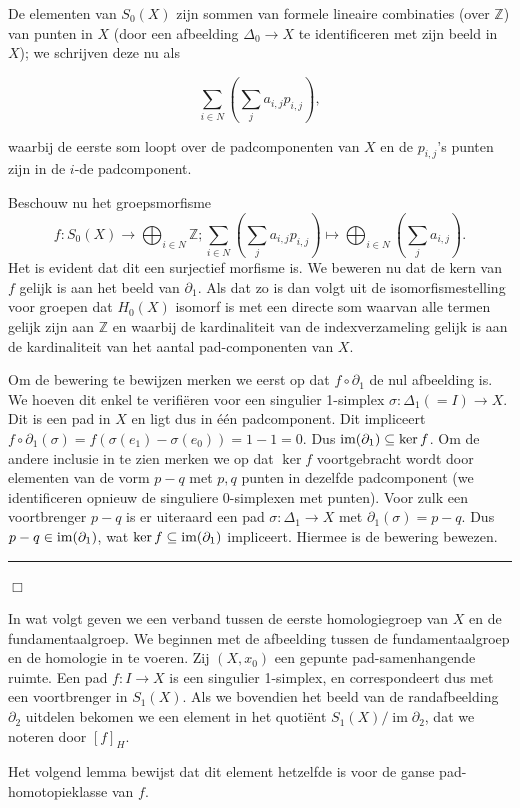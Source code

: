 \documentclass[12pt]{book}
\DeclareMathOperator{\Ima}{im}
\newcommand{\B}{\rule{1mm}{0mm} \hfill $\Box$ }
\begin{document}
De elementen van $S_{0}(X)$ zijn
sommen van formele lineaire combinaties (over $\mathbb{Z}$) van punten in $X$ (door een afbeelding
$\Delta_{0}\to X$ te identificeren met zijn beeld in $X$); we schrijven deze nu als 

$$\sum_{i\in
N}(\sum_{j}a_{i,j}p_{i,j}),$$ 


waarbij de eerste som loopt over de padcomponenten van $X$ en de
$p_{i,j}$'s punten zijn in de $i$-de padcomponent.

Beschouw nu het groepsmorfisme 
$$f:S_{0}(X)\to \bigoplus_{i\in N}\mathbb{Z};
\sum_{i\in N}(\sum_{j}a_{i,j}p_{i,j})\mapsto \bigoplus_{i\in N} (\sum_{j}a_{i,j}).$$ Het is evident dat dit een
surjectief morfisme is.  We beweren nu dat de kern van $f$ gelijk is aan het beeld van
$\partial_{1}$. Als dat zo is dan volgt uit de isomorfismestelling voor groepen dat $H_{0}(X)$
isomorf is met een directe som waarvan alle termen gelijk zijn aan $\mathbb{Z}$ en waarbij de kardinaliteit van de
indexverzameling gelijk is aan de kardinaliteit van het aantal pad-componenten van $X$.

Om de bewering te bewijzen merken we eerst op dat $f\circ \partial_{1}$ de nul afbeelding is. We
hoeven dit enkel te verifi\"eren voor een singulier 1-simplex $\sigma: \Delta_{1}(=I)\to X$. Dit is een pad in
$X$ en ligt dus in \'e\'en padcomponent. Dit impliceert
$f\circ \partial_{1}(\sigma)=f(\sigma(e_{1})-\sigma(e_{0}))=1-1=0.$ Dus $\mbox{{\rm
im}}(\partial_{1})\subseteq \ker f$. 
Om de andere inclusie in  te zien merken we op dat
$\ker f$ voortgebracht wordt door elementen van de vorm $p-q$ met
$p,q$ punten in dezelfde padcomponent (we identificeren opnieuw de singuliere $0$-simplexen met punten). 
Voor zulk een voortbrenger $p-q$ is er uiteraard een pad $\sigma:\Delta_{1}\to X$ met
$\partial_{1}(\sigma)=p-q$. Dus $p-q\in \mbox{{\rm im}}(\partial_{1})$, wat $\ker f\subseteq \mbox{{\rm im}}(\partial_{1})$ impliceert. Hiermee is de bewering bewezen. \B

In wat volgt geven we een verband tussen de eerste homologiegroep van $X$ en de fundamentaalgroep. We beginnen met de afbeelding tussen de fundamentaalgroep en de homologie in te voeren. 
Zij $(X, x_0)$ een gepunte pad-samenhangende ruimte. Een pad $f:I \to X$ is een singulier 1-simplex, en correspondeert dus met een voortbrenger in $S_1(X)$. Als we bovendien het beeld van de randafbeelding $\partial_2$ uitdelen bekomen we een element in het quoti\"ent $S_1(X) / \Ima \partial_2$, dat we noteren door $[f]_H$.

Het volgend lemma bewijst dat dit element hetzelfde is voor de ganse pad-homotopieklasse van $f$.
\end{document}
